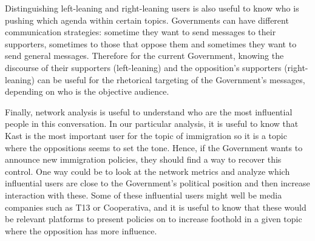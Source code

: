     Distinguishing left-leaning and right-leaning users is also useful to know who is pushing which agenda within certain topics. Governments can have different communication strategies: sometime they want to send messages to their supporters, sometimes to those that oppose them and sometimes they want to send general messages. Therefore for the current Government, knowing the discourse of their supporters (left-leaning) and the opposition's supporters (right-leaning) can be useful for the rhetorical targeting of the Government's messages, depending on who is the objective audience.
    
    Finally, network analysis is useful to understand who are the most influential people in this conversation. In our particular analysis, it is useful to know that Kast is the most important user for the topic of immigration so it is a topic where the oppositions seems to set the tone. Hence, if the Government wants to announce new immigration policies, they should find a way to recover this control. One way could be to look at the network metrics and analyze which influential users are close to the Government's political position and then increase interaction with these. Some of these influential users might well be media companies such as T13 or Cooperativa, and it is useful to know that these would be relevant platforms to present policies on to increase foothold in a given topic where the opposition has more influence.
    
  
    
    